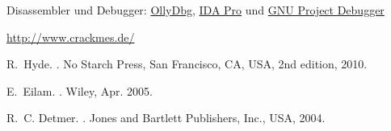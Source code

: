 \begin{thebibliography}{9}
 Disassembler und Debugger:
	\href{http://www.ollydbg.de/}{OllyDbg}, 
	\href{http://www.hex-rays.com/idapro/}{IDA Pro} und
	\href{http://www.gnu.org/software/gdb/}{GNU Project Debugger}

	\url{http://www.crackmes.de/}


R.~Hyde.
.
\newblock No Starch Press, San Francisco, CA, USA, 2nd edition, 2010.

E.~Eilam.
.
\newblock Wiley, Apr. 2005.

R.~C. Detmer.
.
\newblock Jones and Bartlett Publishers, Inc., USA, 2004.

	
\end{thebibliography}
